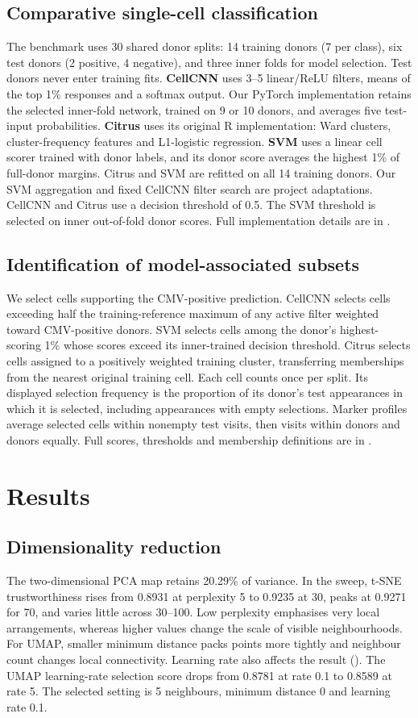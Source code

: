\documentclass[11pt,a4paper]{article}
\begin{document}
\subsection{Comparative single-cell classification}
The benchmark uses 30 shared donor splits: 14 training donors (7 per class), six test donors (2 positive, 4 negative), and three inner folds for model selection. Test donors never enter training fits. \textbf{CellCNN} uses 3--5 linear/ReLU filters, means of the top 1\% responses and a softmax output. Our PyTorch implementation retains the selected inner-fold network, trained on 9 or 10 donors, and averages five test-input probabilities. \textbf{Citrus} uses its original R implementation: Ward clusters, cluster-frequency features and L1-logistic regression. \textbf{SVM} uses a linear cell scorer trained with donor labels, and its donor score averages the highest 1\% of full-donor margins. Citrus and SVM are refitted on all 14 training donors. Our SVM aggregation and fixed CellCNN filter search are project adaptations. CellCNN and Citrus use a decision threshold of 0.5. The SVM threshold is selected on inner out-of-fold donor scores. Full implementation details are in .

\subsection{Identification of model-associated subsets}
We select cells supporting the CMV-positive prediction. CellCNN selects cells exceeding half the training-reference maximum of any active filter weighted toward CMV-positive donors. SVM selects cells among the donor's highest-scoring 1\% whose scores exceed its inner-trained decision threshold. Citrus selects cells assigned to a positively weighted training cluster, transferring memberships from the nearest original training cell. Each cell counts once per split. Its displayed selection frequency is the proportion of its donor's test appearances in which it is selected, including appearances with empty selections. Marker profiles average selected cells within nonempty test visits, then visits within donors and donors equally. Full scores, thresholds and membership definitions are in .

\section{Results}
\subsection{Dimensionality reduction}
The two-dimensional PCA map retains 20.29\% of variance. In the sweep, t-SNE trustworthiness rises from 0.8931 at perplexity 5 to 0.9235 at 30, peaks at 0.9271 for 70, and varies little across 30--100. Low perplexity emphasises very local arrangements, whereas higher values change the scale of visible neighbourhoods. For UMAP, smaller minimum distance packs points more tightly and neighbour count changes local connectivity. Learning rate also affects the result (). The UMAP learning-rate selection score drops from 0.8781 at rate 0.1 to 0.8589 at rate 5. The selected setting is 5 neighbours, minimum distance 0 and learning rate 0.1.
\end{document}
